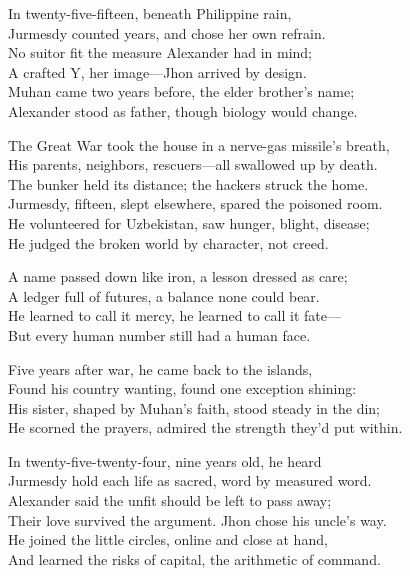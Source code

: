 \begin{lyrics}
In twenty-five-fifteen, beneath Philippine rain,\\
Jurmesdy counted years, and chose her own refrain.\\
No suitor fit the measure Alexander had in mind;\\
A crafted Y, her image—Jhon arrived by design.\\
Muhan came two years before, the elder brother’s name;\\
Alexander stood as father, though biology would change.

The Great War took the house in a nerve-gas missile’s breath,\\
His parents, neighbors, rescuers—all swallowed up by death.\\
The bunker held its distance; the hackers struck the home.\\
Jurmesdy, fifteen, slept elsewhere, spared the poisoned room.\\
He volunteered for Uzbekistan, saw hunger, blight, disease;\\
He judged the broken world by character, not creed.

A name passed down like iron, a lesson dressed as care;\\
A ledger full of futures, a balance none could bear.\\
He learned to call it mercy, he learned to call it fate—\\
But every human number still had a human face.

Five years after war, he came back to the islands,\\
Found his country wanting, found one exception shining:\\
His sister, shaped by Muhan’s faith, stood steady in the din;\\
He scorned the prayers, admired the strength they’d put within.

In twenty-five-twenty-four, nine years old, he heard\\
Jurmesdy hold each life as sacred, word by measured word.\\
Alexander said the unfit should be left to pass away;\\
Their love survived the argument. Jhon chose his uncle’s way.\\
He joined the little circles, online and close at hand,\\
And learned the risks of capital, the arithmetic of command.


\end{lyrics}
